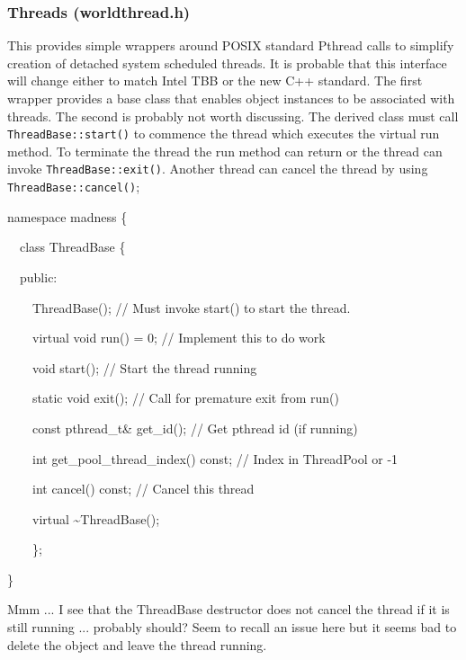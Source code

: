 \documentclass[letterpaper]{article}
\begin{document}
\bigskip

\subsubsection{Threads (worldthread.h)}
This provides simple wrappers around POSIX standard Pthread calls to simplify creation of detached system scheduled
threads. It is probable that this interface will change either to match Intel TBB or the new C++ standard. The first
wrapper provides a base class that enables object instances to be associated with threads. The second is probably not
worth discussing. The derived class must call \texttt{ThreadBase::start()} to commence the thread which executes the
virtual run method. To terminate the thread the run method can return or the thread can invoke
\texttt{ThreadBase::exit()}. Another thread can cancel the thread by using \texttt{ThreadBase::cancel()};

{\ttfamily
namespace madness \{}

{\ttfamily
\ \ class ThreadBase \{}

{\ttfamily
\ \ public:}

{\ttfamily
\ \ \ \ ThreadBase(); // Must invoke start() to start the thread.}

{\ttfamily
\ \ \ \ virtual void run() = 0; // Implement this to do work}

{\ttfamily
\ \ \ \ void start(); // Start the thread running}

{\ttfamily
\ \ \ \ static void exit(); // Call for premature exit from run()}

{\ttfamily
\ \ \ \ const pthread\_t\& get\_id(); // Get pthread id (if running)}

{\ttfamily
\ \ \ \ int get\_pool\_thread\_index() const; // Index in ThreadPool or -1}

{\ttfamily
\ \ \ \ int cancel() const; // Cancel this thread}

{\ttfamily
\ \ \ \ virtual \~{}ThreadBase();}

{\ttfamily
\ \ \ \ \};}

{\ttfamily
\}}


\bigskip

Mmm ... I see that the ThreadBase destructor does not cancel the thread if it is still running ... probably should? Seem
to recall an issue here but it seems bad to delete the object and leave the thread running. 
\end{document}
